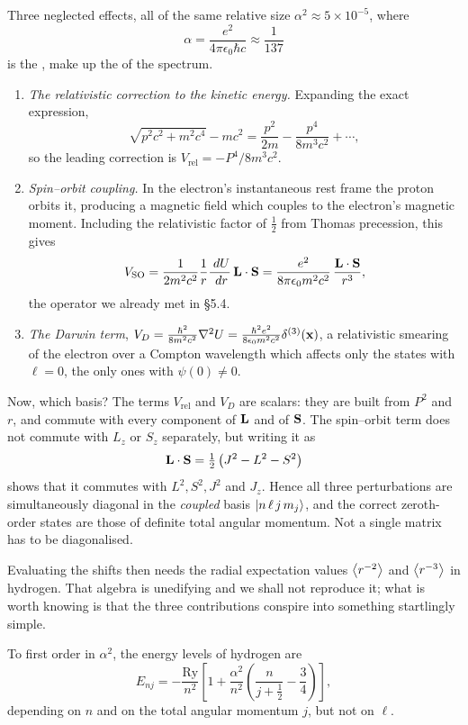 \documentclass[a4paper]{scrartcl}
\newcommand{\half}{\tfrac{1}{2}}
\newcommand{\Ry}{\mathrm{Ry}}
\begin{document}
Three neglected effects, all of the same relative size $\alpha^2 \approx 5\times10^{-5}$, where
$$
\alpha = \frac{e^2}{4\pi\epsilon_0 \hbar c} \approx \frac{1}{137}
$$
is the , make up the  of the spectrum.
\begin{enumerate}[label=(\roman*)]
    \item \emph{The relativistic correction to the kinetic energy.} Expanding the exact expression,
    $$
    \sqrt{p^2c^2 + m^2c^4} - mc^2 = \frac{p^2}{2m} - \frac{p^4}{8m^3c^2} + \cdots,
    $$
    so the leading correction is $V_{\mathrm{rel}} = -P^4/8m^3c^2$.
    \item \emph{Spin--orbit coupling.} In the electron's instantaneous rest frame the proton orbits it, producing a magnetic field which couples to the electron's magnetic moment. Including the relativistic factor of $\half$ from Thomas precession, this gives
    $$
    V_{\mathrm{SO}} = \frac{1}{2m^2c^2}\frac{1}{r}\frac{\; d U}{\; d r}\,\mathbf{L} \cdot \mathbf{S} = \frac{e^2}{8\pi\epsilon_0 m^2c^2}\,\frac{\mathbf{L}\cdot\mathbf{S}}{r^3},
    $$
    the operator we already met in \S5.4.
    \item \emph{The Darwin term}, $V_D = \frac{\hbar^2}{8m^2c^2}\nabla^2 U = \frac{\hbar^2e^2}{8\epsilon_0m^2c^2}\delta^{(3)}(\mathbf{x})$, a relativistic smearing of the electron over a Compton wavelength which affects only the states with $\ell = 0$, the only ones with $\psi(0)\neq0$.
\end{enumerate}

Now, which basis? The terms $V_{\mathrm{rel}}$ and $V_D$ are scalars: they are built from $P^2$ and $r$, and commute with every component of $\mathbf{L}$ and of $\mathbf{S}$. The spin--orbit term does not commute with $L_z$ or $S_z$ separately, but writing it as
$$
\vv L \cdot \vv S = \half\left( J^2 - L^2 - S^2 \right)
$$
shows that it commutes with $L^2, S^2, J^2$ and $J_z$. Hence all three perturbations are simultaneously diagonal in the \emph{coupled} basis $\ket{n\,\ell\,j\,m_j}$, and the correct zeroth-order states are those of definite total angular momentum. Not a single matrix has to be diagonalised.

Evaluating the shifts then needs the radial expectation values $\expval{r^{-2}}$ and $\expval{r^{-3}}$ in hydrogen. That algebra is unedifying and we shall not reproduce it; what is worth knowing is that the three contributions conspire into something startlingly simple.

\begin{theorem}
    To first order in $\alpha^2$, the energy levels of hydrogen are
    $$
    E_{n j} = -\frac{\Ry}{n^2}\left[ 1 + \frac{\alpha^2}{n^2}\left( \frac{n}{j+\half} - \frac34 \right) \right],
    $$
    depending on $n$ and on the total angular momentum $j$, but not on $\ell$.
\end{theorem}
\end{document}
